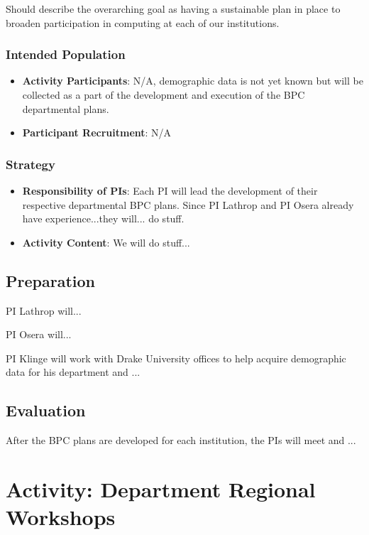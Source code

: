 \documentclass[11pt]{article}
\begin{document}
    Should describe the overarching goal as having a sustainable plan in place to broaden participation in computing at each of our institutions.

    \subsubsection{Intended Population}
    \begin{itemize}
    	\item 
	    \textbf{Activity Participants}: N/A, demographic data is not yet known but will be collected as a part of the development and execution of the BPC departmental plans.

	    \item 
	    \textbf{Participant Recruitment}: N/A
    \end{itemize}

    \subsubsection{Strategy}

    \begin{itemize}
    	\item 
	    \textbf{Responsibility of PIs}: Each PI will lead the development of their respective departmental BPC plans.
	    Since PI Lathrop and PI Osera already have experience...they will... do stuff.

	    \item 
	    \textbf{Activity Content}:
	    We will do stuff...
    \end{itemize}

    \subsection{Preparation}
    PI Lathrop will...

    PI Osera will...

    PI Klinge will work with Drake University offices to help acquire demographic data for his department and ...

    \subsection{Evaluation}
    After the BPC plans are developed for each institution, the PIs will meet and ...

\section{Activity: Department Regional Workshops}
\end{document}
